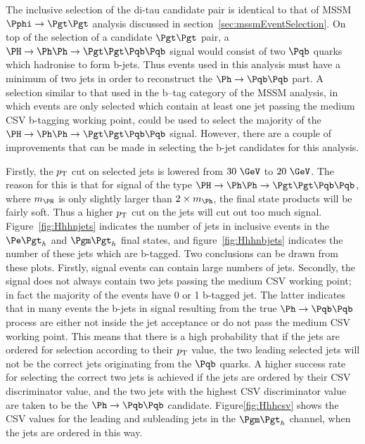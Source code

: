 The inclusive selection of the di-tau candidate pair is identical to that of
\ac{MSSM} $\Pphi\to\Pgt\Pgt$ analysis discussed in
section~\ref{sec:mssmEventSelection}. On top of the selection of a candidate
$\Pgt\Pgt$ pair, a $\PH \to \Ph\Ph \to \Pgt\Pgt \Pqb\Pqb$ signal would consist of two
$\Pqb$ quarks which hadronise to form b-jets. Thus events used in this analysis
must have a minimum of two jets in order to reconstruct the $\Ph\to\Pqb\Pqb$
part. A selection similar to that
used in the b--tag category of the \ac{MSSM} analysis, in which events are only
selected which contain at least one jet passing the medium \ac{CSV} b-tagging working
point, could be used to select the majority of the $\PH \to \Ph\Ph \to \Pgt\Pgt \Pqb\Pqb$
signal. However, there are a couple of improvements that can be made in
selecting the b-jet candidates for this analysis.

Firstly, the $p_{\mathrm{T}}$ cut on selected jets is lowered from
$30~\GeV$ to $20~\GeV$. The reason for this is that for signal of the type
$\PH\to\Ph\Ph\to\Pgt\Pgt\Pqb\Pqb$, where $m_{\PH}$ is only slightly larger than
$2\times m_{\Ph}$, the final state products will be fairly soft. Thus a higher
$p_{\mathrm{T}}$ cut on the jets will cut out too much signal. 
Figure~\ref{fig:Hhhnjets} indicates the number of jets in inclusive
events in the $\etau$ and $\mutau$ final states, and figure~\ref{fig:Hhhnbjets}
indicates the number of these jets which are b-tagged. Two conclusions can be
drawn from these plots. Firstly, signal events can contain large numbers of
jets. Secondly, the signal does not always contain two jets passing the medium
\ac{CSV} working point; in fact the majority of the events have 0 or 1 b-tagged
jet. The latter indicates that in many events the b-jets in signal resulting
from the true $\Ph\to\Pqb\Pqb$ process are either not inside the jet acceptance
or do not pass the medium \ac{CSV} working point. This means that there is a
high probability that if the jets are ordered for selection according to their
$p_{\mathrm{T}}$ value, the two leading selected jets will not be the correct jets
originating from the $\Pqb$ quarks. A higher success rate for selecting the
correct two jets is achieved if the jets are ordered by their \ac{CSV}
discriminator value, and the two jets with the highest \ac{CSV} discriminator
value are taken to be the $\Ph\to\Pqb\Pqb$ candidate. Figure\ref{fig:Hhhcsv} 
shows the \ac{CSV} values for the leading and subleading
jets in the $\mutau$ channel, when the jets are ordered in this way.

